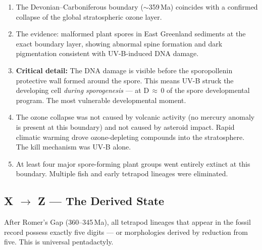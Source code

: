 \documentclass[11pt, a4paper]{article}
\begin{document}
\begin{enumerate}[leftmargin=*, label=(\arabic*)]
\item The Devonian--Carboniferous boundary
  ($\sim$359\,Ma) coincides with a confirmed
  collapse of the global stratospheric ozone layer.

\item The evidence: malformed plant spores in
  East Greenland sediments at the exact boundary
  layer, showing abnormal spine formation and dark
  pigmentation consistent with UV-B-induced DNA
  damage.

\item \textbf{Critical detail:} The DNA damage is
  visible before the sporopollenin protective wall
  formed around the spore. This means UV-B struck
  the developing cell \textit{during sporogenesis}
  --- at D\,$\approx$\,0 of the spore developmental
  program. The most vulnerable developmental moment.

\item The ozone collapse was not caused by volcanic
  activity (no mercury anomaly is present at this
  boundary) and not caused by asteroid impact.
  Rapid climatic warming drove ozone-depleting
  compounds into the stratosphere.
  The kill mechanism was UV-B alone.

\item At least four major spore-forming plant groups
  went entirely extinct at this boundary.
  Multiple fish and early tetrapod lineages were
  eliminated.
\end{enumerate}

\subsection{X $\rightarrow$ Z --- The Derived State}

After Romer's Gap (360--345\,Ma), all tetrapod
lineages that appear in the fossil record possess
exactly five digits --- or morphologies derived
by reduction from five.
This is universal pentadactyly.
\end{document}
